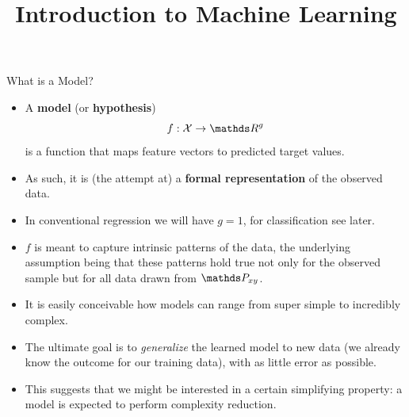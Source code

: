 \documentclass[11pt,compress,t,notes=noshow, xcolor=table]{beamer}
\title{Introduction to Machine Learning}
\institute{\href{https://compstat-lmu.github.io/lecture_i2ml/}{compstat-lmu.github.io/lecture\_i2ml}}
\date{}
\begin{document}









\begin{vbframe}{What is a Model?}

\begin{itemize}

  \item A \textbf{model} (or \textbf{hypothesis}) 
  $$f : \Xspace \rightarrow \R^g$$ 
  is a function that maps feature vectors to predicted target values.
  
  \item As such, it is (the attempt at) a \textbf{formal representation} of the 
  observed data.
  
  \item In conventional regression we will have $g = 1$, for classification
  see later.
  
  \item $f$ is meant to capture intrinsic patterns of the data, the
  underlying assumption being that these patterns hold true not only for the
  observed sample but for all data drawn from $\Pxy$.
  
  \framebreak
  
  \item It is easily conceivable how models can range from super simple to
  incredibly complex.
  
  \item The ultimate goal is to \emph{generalize} the learned model to new
  data (we already know the outcome for our training data), with as little
  error as possible.
  
  \item This suggests that we might be interested in a certain
  simplifying property: a model is expected to perform complexity reduction.
  

\end{itemize}
\end{vbframe}
\end{document}
